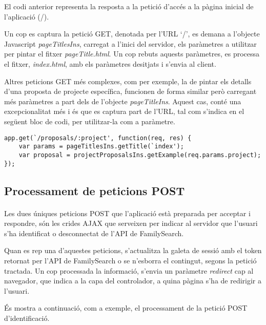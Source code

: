     El codi anterior representa la resposta a la petició d'accés a la pàgina inicial de l'aplicació (/).

    Un cop es captura la petició GET, denotada per l'URL `/',  es demana a l'objecte Javascript \emph{pageTitlesIns}, carregat a l'inici del servidor, els paràmetres a utilitzar per pintar el fitxer \emph{pageTitle.html}. Un cop rebuts aquests paràmetres, es processa el fitxer, \emph{index.html}, amb els paràmetres desitjats i s'envia al client.

    Altres peticions GET més complexes, com per exemple, la de pintar els detalls d'una proposta de projecte específica, funcionen de forma similar però carregant més paràmetres a part dels de l'objecte \emph{pageTitleIns}. Aquest cas, conté una excepcionalitat més i és que es captura part de l'URL, tal com s'indica en el següent bloc de codi, per utilitzar-la com a paràmetre.

    \begin{lstlisting}[style=rawOwn,caption={Exemple d'utilització com a paràmetre, d'una part de l'URL}]
app.get(`/proposals/:project', function(req, res) {
    var params = pageTitlesIns.getTitle(`index');
    var proposal = projectProposalsIns.getExample(req.params.project);
});
    \end{lstlisting}


    \subsection{Processament de peticions POST}

    \paragraph{}
    Les dues úniques peticions POST que l'aplicació està preparada per acceptar i respondre, són les crides AJAX que serveixen per indicar al servidor que l'usuari s'ha identificat o desconnectat de l'API de FamilySearch.

    Quan es rep una d'aquestes peticions, s'actualitza la galeta de sessió amb el token retornat per l'API de FamilySearch o se n'esborra el contingut, segons la petició tractada. Un cop processada la informació, s'envia un paràmetre \emph{redirect} cap al navegador, que indica a la capa del controlador, a quina pàgina s'ha de redirigir a l'usuari.

    És mostra a continuació, com a exemple, el processament de la petició POST d'identificació.

